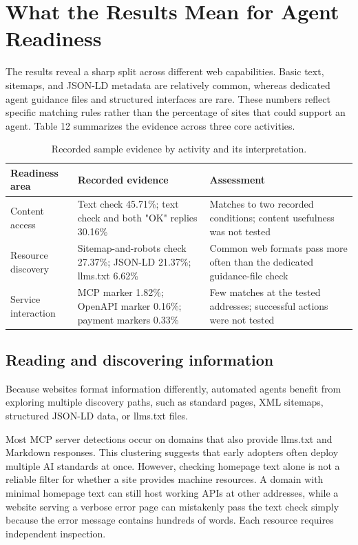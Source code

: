 \documentclass{article}
\begin{document}
\section{What the Results Mean for Agent Readiness}

The results reveal a sharp split across different web capabilities. Basic text, sitemaps, and JSON-LD metadata are relatively common, whereas dedicated agent guidance files and structured interfaces are rare. These numbers reflect specific matching rules rather than the percentage of sites that could support an agent. Table 12 summarizes the evidence across three core activities.


\begin{table}[H]
\centering
\footnotesize
\setlength{\tabcolsep}{3pt}
\sloppy
\caption{Recorded sample evidence by activity and its interpretation.}
\begin{tabularx}{\columnwidth}{>{\raggedright\arraybackslash}p{3.0cm}>{\raggedright\arraybackslash}X>{\raggedright\arraybackslash}X}
\toprule
\textbf{Readiness area} & \textbf{Recorded evidence} & \textbf{Assessment} \\
\midrule
Content access & Text check 45.71\%; text check and both "OK" replies 30.16\% & Matches to two recorded conditions; content usefulness was not tested \\
Resource discovery & Sitemap-and-robots check 27.37\%; JSON-LD 21.37\%; llms.txt 6.62\% & Common web formats pass more often than the dedicated guidance-file check \\
Service interaction & MCP marker 1.82\%; OpenAPI marker 0.16\%; payment markers 0.33\% & Few matches at the tested addresses; successful actions were not tested \\
\bottomrule
\end{tabularx}
\end{table}

\subsection{Reading and discovering information}

Because websites format information differently, automated agents benefit from exploring multiple discovery paths, such as standard pages, XML sitemaps, structured JSON-LD data, or llms.txt files. 

Most MCP server detections occur on domains that also provide llms.txt and Markdown responses. This clustering suggests that early adopters often deploy multiple AI standards at once. However, checking homepage text alone is not a reliable filter for whether a site provides machine resources. A domain with minimal homepage text can still host working APIs at other addresses, while a website serving a verbose error page can mistakenly pass the text check simply because the error message contains hundreds of words. Each resource requires independent inspection.
\end{document}
